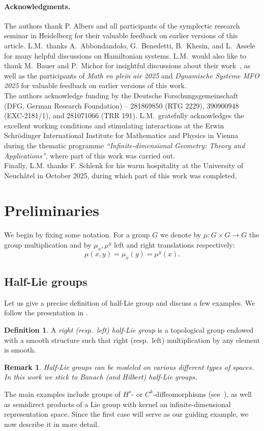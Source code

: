 \documentclass[11pt,reqno]{amsart}
\theoremstyle{plain}
\newtheorem{rem}[thm]{Remark}
\theoremstyle{definition}
\newtheorem{defn}[thm]{Definition}
\theoremstyle{plain} %
\newtheorem{rem}[rem]{Remark}
\theoremstyle{definition} %
\newtheorem{defn}[defn]{Definition}
\numberwithin{equation}{section}
\begin{document}
\paragraph{\textbf{Acknowledgments.}} The authors thank P. Albers and all participants of the symplectic research seminar in Heidelberg for their valuable feedback on earlier versions of this article.
L.M.\ thanks A.~Abbondandolo, G.~Benedetti, B.~Khesin, and L.~Assele for many helpful discussions on Hamiltonian systems.
L.M.\ would also like to thank M.~Bauer and P.~Michor for insightful discussions about their work~\cite{Bauer_2025}, as well as the participants of \emph{Math en plein air 2025} and \emph{Dynamische Systeme MFO 2025} for valuable feedback on earlier versions of this work.\\
The authors acknowledge funding by the Deutsche Forschungsgemeinschaft (DFG, German Research Foundation) – 281869850 (RTG 2229), 390900948 (EXC-2181/1), and 281071066 (TRR 191). L.M.\ gratefully acknowledges the excellent working conditions and stimulating interactions at the Erwin Schrödinger International Institute for Mathematics and Physics in Vienna during the thematic programme \emph{``Infinite-dimensional Geometry: Theory and Applications''}, where part of this work was carried out. \\
Finally, L.M. thanks F. Schlenk for his warm hospitality at the University of Neuchâtel in October 2025, during which part of this work was completed.
\section{Preliminaries}\label{s:preliminaries}
We begin by fixing some notation. For a group $G$ we denote by $\mu \colon G \times G \to G$ the group multiplication and by $\mu_x, \mu^y$ left and right translations respectively:
\[
\mu(x, y) = \mu_x(y) = \mu^y(x).
\]

\subsection{Half-Lie groups}\label{ss: Half Lie grous}
Let us give a precise definition of half-Lie group and discuss a few examples. We follow the presentation in \cite{Bauer_2025}.
\begin{defn}
    A \textit{right (resp.\ left) half-Lie group} is a topological group endowed with a smooth structure such that right (resp.\ left) multiplication by any element is smooth.
\end{defn}
\begin{rem}
    Half-Lie groups can be modeled on various different types of spaces. In this work we stick to Banach (and Hilbert) half-Lie groups.
\end{rem} 
The main examples include groups of $H^s$- or $C^k$-diffeomorphisms (see~\cite{EM70}), 
as well as semidirect products of a Lie group with kernel an infinite-dimensional representation space. 
Since the first case will serve as our guiding example, we now describe it in more detail.
\end{document}
